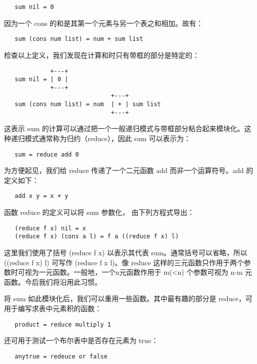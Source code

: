 \documentclass[12pt,a4paper]{article}
\begin{document}
\begin{verbatim}
   sum nil = 0
\end{verbatim}

因为一个 cons 的和是其第一个元素与另一个表之和相加。故有：

\begin{verbatim}
   sum (cons num list) = num + sum list
\end{verbatim}

检查以上定义，我们发现在计算和时只有带框的部分是特定的：

\begin{verbatim}
             +---+
   sum nil = | 0 |
             +---+
                              +---+
   sum (cons num list) = num  | + | sum list
                              +---+
\end{verbatim}

这表示 sum 的计算可以通过把一个一般递归模式与带框部分粘合起来模块化。这种递归模式通常称为归约（reduce），因此 sum 可以表示为：

\begin{verbatim}
   sum = reduce add 0
\end{verbatim}

为方便起见，我们给 reduce 传递了一个二元函数 add 而非一个运算符号。add 的定义如下：

\begin{verbatim}
   add x y = x + y
\end{verbatim}

函数 reduce 的定义可以将 sum 参数化， 由下列方程式导出：

\begin{verbatim}
   (reduce f x) nil = x
   (reduce f x) (cons a l) = f a ((reduce f x) l)
\end{verbatim}

这里我们使用了括号 (reduce f x) 以表示其代表 sum。通常括号可以省略，所以 ((reduce f x) l) 可写作 (reduce f x l)。像 reduce 这样的三元函数只作用于两个参数时可视为一元函数。一般地，一个n元函数作用于 m(<n) 个参数可视为 n-m 元函数。今后我们将沿用此习惯。

将 sum 如此模块化后，我们可以重用一些函数。其中最有趣的部分是 reduce，可用于编写求表中元素积的函数：

\begin{verbatim}
   product = reduce multiply 1
\end{verbatim}

还可用于测试一个布尔表中是否存在元素为 true：

\begin{verbatim}
   anytrue = redeuce or false
\end{verbatim}
\end{document}

